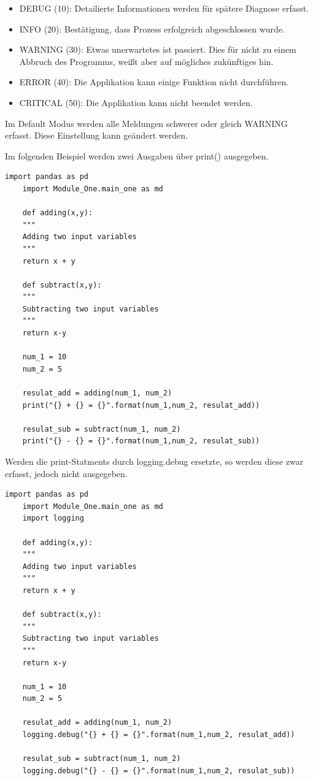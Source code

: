 \begin{itemize}
	\item DEBUG (10): Detailierte Informationen werden für spätere Diagnose erfasst.
	\item INFO (20): Bestätigung, dass Prozess erfolgreich abgeschlossen wurde.
	\item WARNING (30): Etwas unerwartetes ist passiert. Dies für nicht zu einem Abbruch des Programms, weißt aber auf mögliches zukünftiges hin.
	\item ERROR (40): Die Applikation kann einige Funktion nicht durchführen.
	\item CRITICAL (50): Die Applikation kann nicht beendet werden.
\end{itemize}

Im Default Modus werden alle Meldungen schwerer oder gleich WARNING erfasst. Diese Einstellung kann geändert werden.

Im folgenden Beispiel werden zwei Ausgaben über print() ausgegeben.
\begin{lstlisting}[style=python]
	import pandas as pd
	import Module_One.main_one as md
	
	def adding(x,y):
	"""
	Adding two input variables
	"""
	return x + y 
	
	def subtract(x,y):
	"""
	Subtracting two input variables
	"""
	return x-y
	
	num_1 = 10
	num_2 = 5
	
	resulat_add = adding(num_1, num_2)
	print("{} + {} = {}".format(num_1,num_2, resulat_add))
	
	resulat_sub = subtract(num_1, num_2)
	print("{} - {} = {}".format(num_1,num_2, resulat_sub))
\end{lstlisting}

Werden die print-Statments durch logging.debug ersetzte, so werden diese zwar erfasst, jedoch nicht ausgegeben. 

\begin{lstlisting}[style=python]
	import pandas as pd
	import Module_One.main_one as md
	import logging
	
	def adding(x,y):
	"""
	Adding two input variables
	"""
	return x + y 
	
	def subtract(x,y):
	"""
	Subtracting two input variables
	"""
	return x-y
	
	num_1 = 10
	num_2 = 5
	
	resulat_add = adding(num_1, num_2)
	logging.debug("{} + {} = {}".format(num_1,num_2, resulat_add))
	
	resulat_sub = subtract(num_1, num_2)
	logging.debug("{} - {} = {}".format(num_1,num_2, resulat_sub))
\end{lstlisting}

